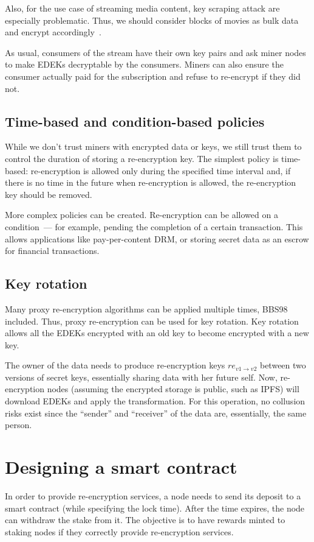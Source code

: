 \documentclass[longbibliography,nofootinbib]{revtex4-1}
\begin{document}
Also, for the use case of streaming media content, key scraping attack are especially problematic.
Thus, we should consider blocks of movies as bulk data and encrypt accordingly~\cite{aont-bulk}.

As usual, consumers of the stream have their own key pairs and ask miner nodes to make EDEKs decryptable by the consumers.
Miners can also ensure the consumer actually paid for the subscription and refuse to re-encrypt if they did not.

\subsection{Time-based and condition-based policies}

While we don't trust miners with encrypted data or keys, we still trust them to control the duration of storing a re-encryption key.
The simplest policy is time-based: re-encryption is allowed only during the specified time interval and, if there is no time in the future when
re-encryption is allowed, the re-encryption key should be removed.

More complex policies can be created.
Re-encryption can be allowed on a condition~--- for example, pending the completion of a certain transaction.
This allows applications like pay-per-content DRM, or storing secret data as an escrow for financial transactions.

\subsection{Key rotation}
\label{sec:key-rotation}

Many proxy re-encryption algorithms can be applied multiple times, BBS98~\cite{BBS98} included.
Thus, proxy re-encryption can be used for key rotation.
Key rotation allows all the EDEKs encrypted with an old key to become encrypted with a new key.

The owner of the data needs to produce re-encryption keys $re_{v1\rightarrow v2}$ between two versions of secret keys, essentially
sharing data with her future self.
Now, re-encryption nodes (assuming the encrypted storage is public, such as IPFS) will download EDEKs and apply the transformation.
For this operation, no collusion risks exist since the ``sender'' and ``receiver'' of the data are, essentially, the same person.

\section{Designing a smart contract}
\label{sec:smart-contract}
In order to provide re-encryption services, a node needs to send its deposit to a smart contract (while specifying the lock time).
After the time expires, the node can withdraw the stake from it.
The objective is to have rewards minted to staking nodes if they correctly provide re-encryption services.
\end{document}
